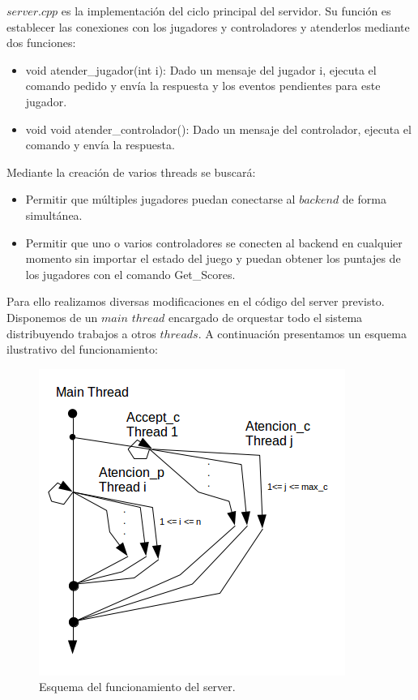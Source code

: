 $server.cpp$ es la implementación del ciclo principal del servidor. Su función es establecer las conexiones con los jugadores y controladores y atenderlos mediante dos funciones:

\begin{itemize}
	\item void atender\_jugador(int i): Dado un mensaje del jugador i, ejecuta el comando pedido y envía la respuesta y los eventos pendientes para este jugador.
	\item void void atender\_controlador(): Dado un mensaje del controlador, ejecuta el comando y envía la respuesta.
\end{itemize}

Mediante la creación de varios threads se buscará:

\begin{itemize}
	\item Permitir que múltiples jugadores puedan conectarse al $backend$ de forma simultánea.
	\item Permitir que uno o varios controladores se conecten al backend en cualquier momento sin importar el estado del juego y puedan obtener los puntajes de los jugadores con el comando Get\_Scores.
\end{itemize}

Para ello realizamos diversas modificaciones en el código del server previsto. Disponemos de un $main$ $thread$ encargado de orquestar todo el sistema distribuyendo trabajos a otros $threads$. A continuación presentamos un esquema ilustrativo del funcionamiento:

\begin{figure}[H]
\centering\includegraphics[scale=0.7]{imgs/server.png}
\caption{Esquema del funcionamiento del server.}
\end{figure}

